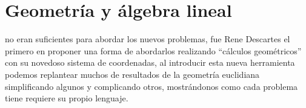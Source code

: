 \chapter{Geometría y álgebra lineal} %
\label{cha:geometria_y_algebra_lineal}

\noindent {} no eran suficientes para abordar los nuevos problemas, fue Rene
Descartes el primero en proponer una forma de abordarlos realizando ``cálculos
geométricos'' con su novedoso sistema de coordenadas, al introducir esta nueva
herramienta podemos replantear muchos de resultados de la geometría euclidiana 
simplificando algunos y complicando otros, mostrándonos como cada problema tiene
requiere su  propio lenguaje.


